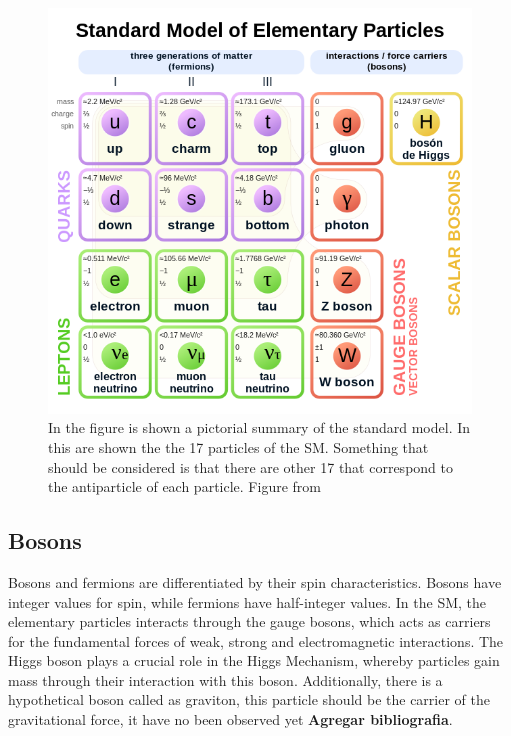 \begin{figure}[!htb]
\centering
\includegraphics[scale=0.5]{Figures/Chapter1/Standard_Model_of_Elementary_Particles.png}

        \caption{In the figure is shown a pictorial summary of the standard model. In this are shown the the 17 particles of the SM. Something that should be considered is that there are other 17 that correspond to the antiparticle of each particle. Figure from \cite{SM_Table}} 
\label{fig:SM}
\end{figure}
 
\subsection{Bosons}
Bosons and fermions are differentiated by their spin characteristics. Bosons have integer values for spin, while fermions have half-integer values. In the SM, the elementary particles interacts through the gauge bosons, which acts as carriers for the fundamental forces of weak, strong and electromagnetic interactions. The Higgs boson plays a crucial role in the Higgs Mechanism, whereby particles gain mass through their interaction with this boson. Additionally, there is a hypothetical boson called as graviton, this particle should be the carrier of the gravitational force, it have no been observed yet \textbf{Agregar bibliografia}.  

